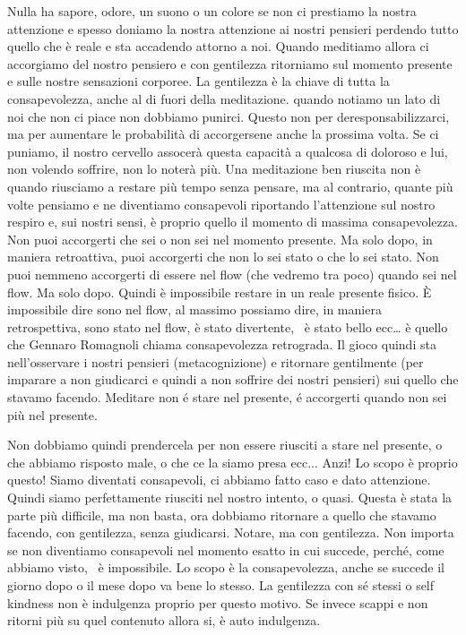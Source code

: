 \documentclass[12pt]{book} %
\begin{document}
Nulla ha sapore, odore, un suono o un colore se non ci prestiamo la nostra attenzione e spesso doniamo la nostra
attenzione ai nostri pensieri perdendo tutto quello che è reale e sta accadendo attorno a noi. Quando meditiamo allora
ci accorgiamo del nostro pensiero e con gentilezza ritorniamo sul momento presente e sulle nostre sensazioni corporee.
La gentilezza è la chiave di tutta la consapevolezza, anche al di fuori della meditazione. quando notiamo un lato di
noi che non ci piace non dobbiamo punirci. Questo non per deresponsabilizzarci, ma per aumentare le probabilità di
accorgersene anche la prossima volta. Se ci puniamo, il nostro cervello assocerà questa capacità a qualcosa di doloroso
e lui, non volendo soffrire, non lo noterà più. Una meditazione ben riuscita non è quando riusciamo a restare più tempo
senza pensare, ma al contrario, quante più volte pensiamo e ne diventiamo consapevoli riportando
l'attenzione sul nostro respiro e, sui nostri sensi, è proprio quello il momento di massima
consapevolezza. Non puoi accorgerti che sei o non sei nel momento presente. Ma solo dopo, in maniera retroattiva, puoi
accorgerti che non lo sei stato o che lo sei stato. Non puoi nemmeno accorgerti di essere nel flow (che vedremo tra
poco) quando sei nel flow. Ma solo dopo. Quindi è impossibile restare in un reale presente fisico. È impossibile dire
sono nel flow, al massimo possiamo dire, in maniera retrospettiva, sono stato nel flow, è stato divertente, \ è stato
bello ecc… è quello che Gennaro Romagnoli chiama consapevolezza retrograda. Il gioco quindi sta
nell'osservare i nostri pensieri (metacognizione) e ritornare gentilmente (per imparare a non
giudicarci e quindi a non soffrire dei nostri pensieri) sui quello che stavamo facendo.
Meditare non é stare nel presente, é accorgerti quando non sei più nel presente.

Non dobbiamo quindi prendercela per non essere riusciti a stare nel presente, o che abbiamo risposto male, o che ce la
siamo presa ecc... Anzi! Lo scopo è proprio questo! Siamo diventati consapevoli, ci abbiamo fatto caso e dato
attenzione. Quindi siamo perfettamente riusciti nel nostro intento, o quasi. Questa è stata la parte più difficile, ma
non basta, ora dobbiamo ritornare a quello che stavamo facendo, con gentilezza, senza giudicarsi. Notare, ma con
gentilezza. Non importa se non diventiamo consapevoli nel momento esatto in cui succede, perché, come abbiamo visto,
\ è impossibile. Lo scopo è la consapevolezza, anche se succede il giorno dopo o il mese dopo va bene lo stesso. La
gentilezza con sé stessi o self kindness non è indulgenza proprio per questo motivo. Se invece scappi e non ritorni più
su quel contenuto allora si, è auto indulgenza.
\end{document}
